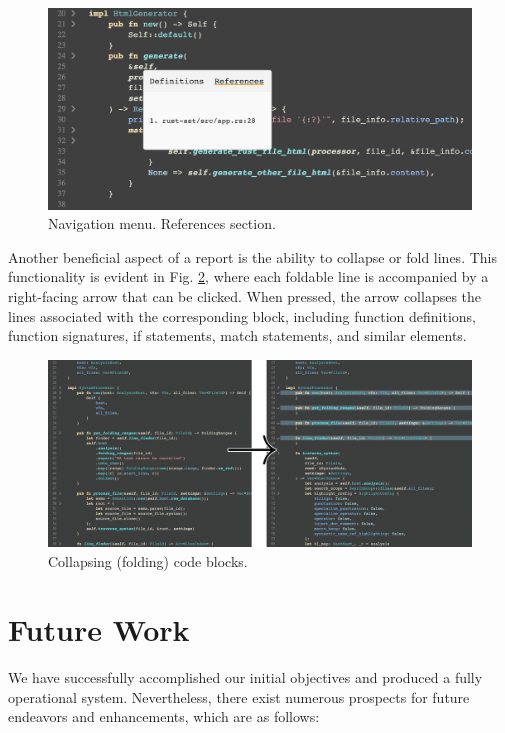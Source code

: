 \begin{figure}[ht]
\centering
\includegraphics[width=15cm]{figs/screenshots/nav_refs_2.png}
\caption{Navigation menu. References section.}
\label{fig:nav_refs}
\end{figure}

Another beneficial aspect of a report is the ability to collapse or fold lines. This functionality is evident in Fig. \ref{fig:fold}, where each foldable line is accompanied by a right-facing arrow that can be clicked. When pressed, the arrow collapses the lines associated with the corresponding block, including function definitions, function signatures, if statements, match statements, and similar elements.

\begin{figure}[ht]
\centering
\includegraphics[width=15cm]{figs/screenshots/fold.png}
\caption{Collapsing (folding) code blocks.}
\label{fig:fold}
\end{figure}

\section{Future Work}

We have successfully accomplished our initial objectives and produced a fully operational system. Nevertheless, there exist numerous prospects for future endeavors and enhancements, which are as follows:

